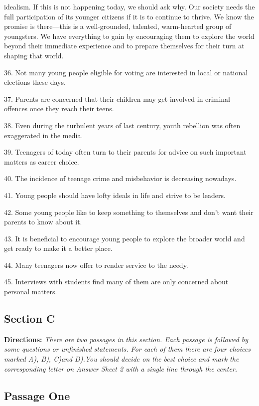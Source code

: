\documentclass[UTF8,11pt]{ctexart}
\begin{document}
idealism. If this is not happening today, we should ask why. Our society needs the full participation of its younger citizens if it is to continue to thrive. We know the promise is there—this is a well-grounded, talented, warm-hearted group of youngsters. We have everything to gain by encouraging them to explore the world beyond their immediate experience and to prepare themselves for their turn at shaping that world.


36. Not many young people eligible for voting are interested in local or national elections these days.


37. Parents are concerned that their children may get involved in criminal offences once they reach their teens.


38. Even during the turbulent years of last century, youth rebellion was often exaggerated in the media.


39. Teenagers of today often turn to their parents for advice on such important matters as career choice.


40. The incidence of teenage crime and misbehavior is decreasing nowadays.


41. Young people should have lofty ideals in life and strive to be leaders.


42. Some young people like to keep something to themselves and don’t want their parents to know about it.


43. It is beneficial to encourage young people to explore the broader world and get ready to make it a better place.


44. Many teenagers now offer to render service to the needy.


45. Interviews with students find many of them are only concerned about personal matters.


\subsection*{\textbf{Section C}}


\textbf{Directions:} \textit{There are two passages in this section. Each passage is followed by some questions or unfinished} \textit{statements. For each of them there are four choices marked A), B), C)and D).You should decide on the best choice} \textit{and mark the corresponding letter on Answer Sheet 2 with a single line through the center.}


\subsection*{\textbf{Passage One}}
\end{document}
